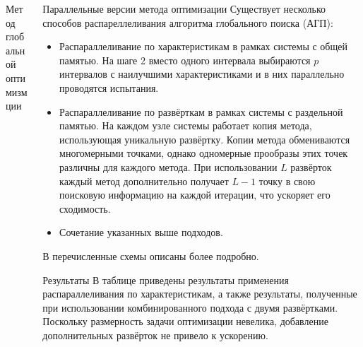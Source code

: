 \documentclass{beamer}
\begin{document}
\begin{frame}[t]
\begin{columns}[t]
\begin{column}[t]{0.48\paperwidth}
\begin{block}{Метод глобальной оптимизмции}
            \end{block}
        \end{column}
        \begin{column}[t]{0.48\paperwidth}
          \begin{block}{Параллельные версии метода оптимизации}
            Существует несколько способов распареллеливания алгоритма глобального поиска (АГП):
            \begin{itemize}
              \justifying
              \item Распараллеливание по характеристикам в рамках системы с общей памятью.
              На шаге 2 вместо одного интервала выбираются \(p\) интервалов с наилучшими характеристиками и в них параллельно проводятся испытания.
              \item Распараллеливание по развёрткам в рамках системы с раздельной памятью. На каждом узле системы работает копия метода, использующая
              уникальную развёртку. Копии метода обмениваются многомерными точками, однако одномерные прообразы этих точек различны для каждого метода.
              При использовании \(L\) развёрток каждый метод дополнительно получает \(L-1\) точку в свою поисковую информацию на каждой итерации, что
              ускоряет его сходимость.
              \item Сочетание указанных выше подходов.
            \end{itemize}
          В \cite{optParallelBook} перечисленные схемы описаны более подробно.
          \end{block}
          \begin{block}{Результаты}
            В таблице приведены результаты применения распараллеливания по характеристикам, а также
            результаты, полученные при использовании комбинированного подхода с двумя развёртками.
            Поскольку размерность задачи оптимизации невелика, добавление дополнительных развёрток не привело к ускорению.


\end{block}
\end{column}
\end{columns}
\end{frame}
\end{document}
